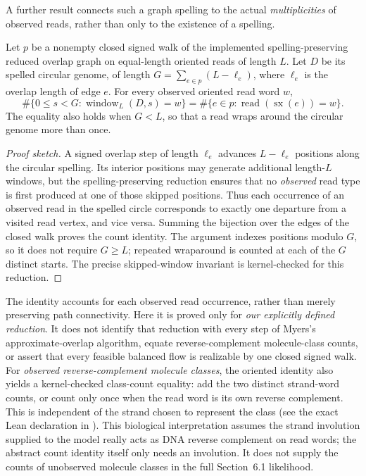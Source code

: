 A further result connects such a graph spelling to the actual
\emph{multiplicities} of observed reads, rather than only to the existence
of a spelling.

\begin{theorem}
\label{thm:reduced-circuit-occurrences}
Let $p$ be a nonempty closed signed walk of the implemented
spelling-preserving reduced overlap graph on equal-length oriented reads
of length $L$. Let $D$ be its spelled circular genome, of length
$G=\sum_{e\in p}(L-\ell_e)$, where $\ell_e$ is the overlap length of
edge $e$. For every observed oriented read word $w$,
\[
  \#\{0\le s<G:\operatorname{window}_L(D,s)=w\}
  =
  \#\{e\in p:\operatorname{read}(\operatorname{sx}(e))=w\}.
\]
The equality also holds when $G<L$, so that a read wraps around the
circular genome more than once.
\end{theorem}
\begin{proof}[Proof sketch]
A signed overlap step of length $\ell_e$ advances
$L-\ell_e$ positions along the circular spelling. Its
interior positions may generate additional length-$L$
windows, but the spelling-preserving reduction ensures
that no \emph{observed} read type is first produced at
one of those skipped positions. Thus each occurrence
of an observed read in the spelled circle corresponds
to exactly one departure from a visited read vertex,
and vice versa. Summing the bijection over the edges
of the closed walk proves the count identity.
The argument indexes positions modulo $G$, so it
does not require $G\ge L$; repeated wraparound is
counted at each of the $G$ distinct starts.
The precise skipped-window invariant is
kernel-checked for this reduction.
\end{proof}

The identity accounts for each observed read occurrence,
rather than merely preserving path connectivity. Here it
is proved only for \emph{our explicitly defined reduction}. It does not
identify that reduction with every step of Myers's approximate-overlap
algorithm, equate reverse-complement molecule-class counts, or assert
that every feasible balanced flow is realizable by one closed signed walk.
For \emph{observed reverse-complement molecule classes}, the oriented
identity also yields a kernel-checked class-count equality: add the two
distinct strand-word counts, or count only once when the read word is its
own reverse complement. This is independent of the strand chosen to
represent the class
(see the exact Lean declaration in ).
This biological interpretation assumes the strand involution supplied to
the model really acts as DNA reverse complement on read words; the abstract
count identity itself only needs an involution. It does not supply the
counts of unobserved molecule classes in the full Section~6.1 likelihood.

